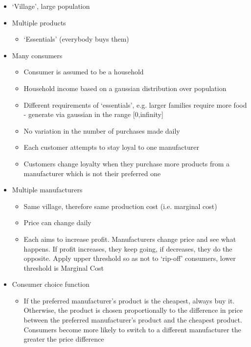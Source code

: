 \documentclass[11pt]{article}
\begin{document}
\begin{itemize}
\item `Village', large population
\item Multiple products

\begin{itemize}
\item `Essentials' (everybody buys them)
\end{itemize}

\item Many consumers

\begin{itemize}
\item Consumer is assumed to be a household
\item Household income based on a gaussian distribution over population
\item Different requirements of `essentials', e.g. larger families require more food - generate via gaussian in the range [0,infinity]
\item No variation in the number of purchases made daily
\item Each customer attempts to stay loyal to one manufacturer
\item Customers change loyalty when they purchase more products from a manufacturer which is not their preferred one
\end{itemize}

\item Multiple manufacturers

\begin{itemize}
\item Same village, therefore same production cost (i.e. marginal cost)
\item Price can change daily
\item Each aims to increase profit. Manufacturers change price and see what happens. If profit increases, they keep going, if decreases, they do the opposite. Apply upper threshold so as not to `rip-off' consumers, lower threshold is Marginal Cost
\end{itemize}

\item Consumer choice function

\begin{itemize}
\item If the preferred manufacturer's product is the cheapest, always buy it. Otherwise, the product is chosen proportionally to the difference in price between the preferred manufacturer's product and the cheapest product. Consumers become more likely to switch to a different manufacturer the greater the price difference
\end{itemize}

\end{itemize}
\end{document}
